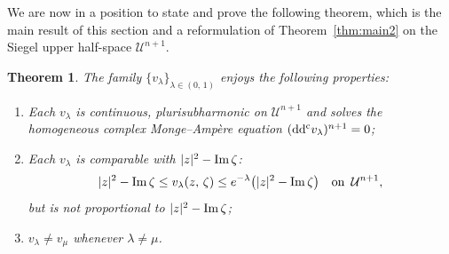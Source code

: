 \documentclass[12pt,a4paper]{amsart}
\numberwithin{equation}{section}
\newtheorem{theorem}{Theorem}[section]
\theoremstyle{definition}
\newcommand{\ddc}{{\rm dd^c}}
\begin{document}
We are now in a position to state and prove the following theorem, which is the main result of this section and a reformulation of Theorem~\ref{thm:main2} on the Siegel upper half-space $\mathcal{U}^{n+1}$.

\begin{theorem}\label{thm:upper-half-space-family}
The family $\{v_{\lambda}\}_{\lambda\in(0,\, 1)}$ enjoys the following properties:
  \begin{enumerate}[label=\textup{(\roman*)}, leftmargin=2.0pc, parsep=4pt]
    \item Each $v_{\lambda}$ is continuous, plurisubharmonic on $\mathcal{U}^{n+1}$ and solves the homogeneous complex Monge--Amp\`ere equation
          $(\ddc v_{\lambda})^{n+1}=0$;

    \item Each $v_{\lambda}$ is comparable with $|z|^{2}-{\rm Im}\,\zeta$:
          $$
          |z|^{2}-{\rm Im}\,\zeta \leq  v_{\lambda}(z,\, \zeta) \leq e^{-\lambda} \bigl(|z|^{2}-{\rm Im}\,\zeta\bigr)
          \quad {\rm on }\ \, \mathcal{U}^{n+1},
          $$
          but is not proportional to $|z|^{2}-{\rm Im}\,\zeta$;
    \item $v_{\lambda}\neq v_{\mu}$ whenever $\lambda\neq\mu$.
   \end{enumerate}
\end{theorem}
\end{document}
